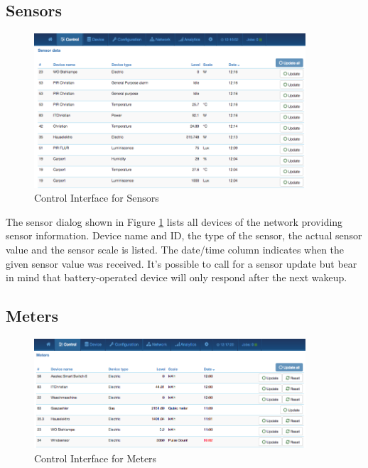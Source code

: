 \subsection{Sensors}

\begin{figure}
\begin{center}
\includegraphics[width=0.9\textwidth]{pngs/cap7/eui3.png}
\caption{Control Interface for Sensors}
\label{eui3}
\end{center}
\end{figure}

The sensor dialog shown in Figure \ref{eui3} lists all devices of the network providing 
sensor information. Device name and ID, the type of the sensor, the actual sensor value 
and the sensor scale is listed. The date/time column indicates when the given sensor 
value was received. It’s possible to call for a sensor update but bear in mind that 
battery-operated device will only respond after the next wakeup.

\subsection{Meters}

\begin{figure}
\begin{center}
\includegraphics[width=0.9\textwidth]{pngs/cap7/eui4.png}
\caption{Control Interface for Meters}
\label{eui4}
\end{center}
\end{figure}

